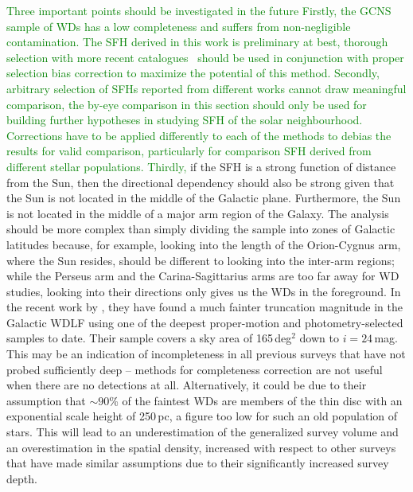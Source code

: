 \documentclass[fleqn,usenatbib]{mnras}
\begin{document}
\textcolor{green}{Three important points should be investigated in the future
Firstly, the GCNS sample of WDs has a low completeness and suffers from
non-negligible contamination. The SFH derived in this work is preliminary
at best, thorough selection with more recent catalogues~\citep[e.g.][]{2021MNRAS.508.3877G}
should be used in conjunction with proper selection bias correction to maximize
the potential of this method. Secondly, arbitrary selection of SFHs reported
from different works cannot draw meaningful comparison, the by-eye comparison
in this section should only be used for building further hypotheses in studying
SFH of the solar neighbourhood. Corrections have to be applied differently to
each of the methods to debias the results for valid comparison, particularly
for comparison SFH derived from different stellar populations. Thirdly,} if the
SFH is a strong function of distance from the Sun, then the directional
dependency should also be strong given that the Sun is not located in the middle
of the Galactic plane. Furthermore, the Sun is not located in the middle of a
major arm region of the Galaxy. The analysis should be more complex than simply
dividing the sample into zones of Galactic latitudes because, for example,
looking into the length of the Orion-Cygnus arm, where the Sun resides, should
be different to looking into the inter-arm regions; while the Perseus arm and
the Carina-Sagittarius arms are too far away for WD studies, looking into their
directions only gives us the WDs in the foreground. In the recent work by
\citet{2024MNRAS.535.3611Q}, they have found a much fainter truncation
magnitude in the Galactic WDLF using one of the deepest proper-motion and
photometry-selected samples to date. Their sample covers a sky area of
165\,deg$^2$ down to $i=24$\,mag. This may be an indication of incompleteness
in all previous surveys that have not probed sufficiently deep -- methods for
completeness correction are not useful when there are no detections at all.
Alternatively, it could be due to their assumption that $\sim90$\% of the
faintest WDs are members of the thin disc with an exponential scale height of
250\,pc, a figure too low for such an old population of stars. This will lead
to an underestimation of the generalized survey volume and an overestimation
in the spatial density, increased with respect to other surveys that have made
similar assumptions due to their significantly increased survey depth.
\end{document}
